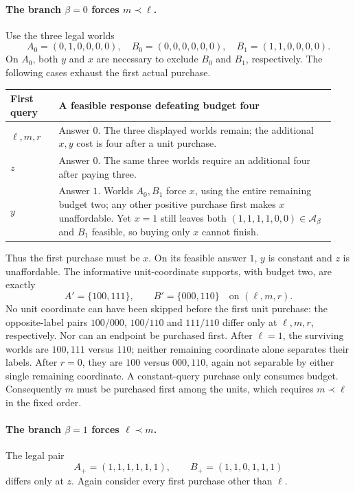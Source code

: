 \documentclass[pdflatex,sn-mathphys-num]{sn-jnl}
\theoremstyle{thmstyleone}
\theoremstyle{thmstylethree}
\theoremstyle{thmstyletwo}
\begin{document}
\paragraph*{The branch $\beta=0$ forces $m\prec\ell$.}
Use the three legal worlds
\[
 A_0=(0,1,0,0,0,0),\quad B_0=(0,0,0,0,0,0),\quad
 B_1=(1,1,0,0,0,0).
\]
On $A_0$, both $y$ and $x$ are necessary to exclude $B_0$ and $B_1$,
respectively. The following cases exhaust the first actual purchase.

\begin{center}\small
\begin{tabular}{@{}p{0.14\linewidth}p{0.80\linewidth}@{}}
\toprule
First query & A feasible response defeating budget four\\\midrule
$\ell,m,r$ & Answer $0$. The three displayed worlds remain; the
additional $x,y$ cost is four after a unit purchase.\\
$z$ & Answer $0$. The same three worlds require an additional four after
paying three.\\
$y$ & Answer $1$. Worlds $A_0,B_1$ force $x$, using the entire remaining
budget two; any other positive purchase first makes $x$ unaffordable.
Yet $x=1$ still leaves both $(1,1,1,1,0,0)\in\mathcal A_\beta$ and
$B_1$ feasible, so buying only $x$ cannot finish.\\
\bottomrule
\end{tabular}
\end{center}

Thus the first purchase must be $x$. On its feasible answer $1$, $y$ is
constant and $z$ is unaffordable. The informative unit-coordinate
supports, with budget two, are exactly
\[
 A' = \{100,111\},\qquad B'=\{000,110\}
 \quad\text{on }(\ell,m,r).
\]
No unit coordinate can have been skipped before the first unit purchase:
the opposite-label pairs $100/000$, $100/110$ and $111/110$ differ only
at $\ell,m,r$, respectively. Nor can an endpoint be purchased first.
After $\ell=1$, the surviving worlds are $100,111$ versus $110$;
neither remaining coordinate alone separates their labels. After $r=0$,
they are $100$ versus $000,110$, again not separable by either single
remaining coordinate. A constant-query purchase only consumes budget.
Consequently $m$ must be purchased first among the units, which requires
$m\prec\ell$ in the fixed order.

\paragraph*{The branch $\beta=1$ forces $\ell\prec m$.}
The legal pair
\[
 A_+=(1,1,1,1,1,1),\qquad B_+=(1,1,0,1,1,1)
\]
differs only at $z$. Again consider every first purchase other than
$\ell$.
\end{document}
